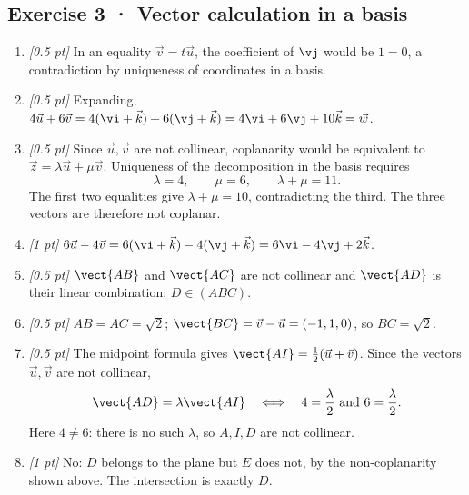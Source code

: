 \subsection*{Exercise 3 · Vector calculation in a basis}\begin{enumerate}

\item \textit{[0.5 pt]} In an equality $\vec v=t\vec u$, the coefficient of $\vj $ would be $1=0$, a contradiction by uniqueness of coordinates in a basis.

\item \textit{[0.5 pt]} Expanding, $4\vec u+6\vec v=4(\vi +\vec k)+6(\vj +\vec k)=4\vi +6\vj +10\vec k=\vec w$.

\item \textit{[0.5 pt]} Since $\vec u,\vec v$ are not collinear, coplanarity would be equivalent to $\vec z=\lambda\vec u+\mu\vec v$. Uniqueness of the decomposition in the basis requires
\[\lambda=4,\qquad\mu=6,\qquad\lambda+\mu=11.\]
The first two equalities give $\lambda+\mu=10$, contradicting the third. The three vectors are therefore not coplanar.

\item \textit{[1 pt]} $6\vec u-4\vec v=6(\vi +\vec k)-4(\vj +\vec k)=6\vi -4\vj +2\vec k$.

\item \textit{[0.5 pt]} $\vect{AB}$ and $\vect{AC}$ are not collinear and $\vect{AD}$ is their linear combination: $D\in(ABC)$.

\item \textit{[0.5 pt]} $AB=AC=\sqrt2$; $\vect{BC}=\vec v-\vec u=(-1,1,0)$, so $BC=\sqrt2$.

\item \textit{[0.5 pt]} The midpoint formula gives $\vect{AI}=\frac12(\vec u+\vec v)$. Since the vectors $\vec u,\vec v$ are not collinear,
\[\vect{AD}=\lambda\vect{AI}\quad\Longleftrightarrow\quad 4=\frac{\lambda}{2}\ \text{and}\ 6=\frac{\lambda}{2}.\]
Here $4\ne 6$: there is no such $\lambda$, so $A,I,D$ are not collinear.

\item \textit{[1 pt]} No: $D$ belongs to the plane but $E$ does not, by the non-coplanarity shown above. The intersection is exactly $D$.

\end{enumerate}

